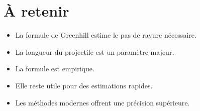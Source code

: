 \section{À retenir}

\begin{aretenir}

\begin{itemize}
    \item La formule de Greenhill estime le pas de rayure nécessaire.
    \item La longueur du projectile est un paramètre majeur.
    \item La formule est empirique.
    \item Elle reste utile pour des estimations rapides.
    \item Les méthodes modernes offrent une précision supérieure.
\end{itemize}

\end{aretenir}
